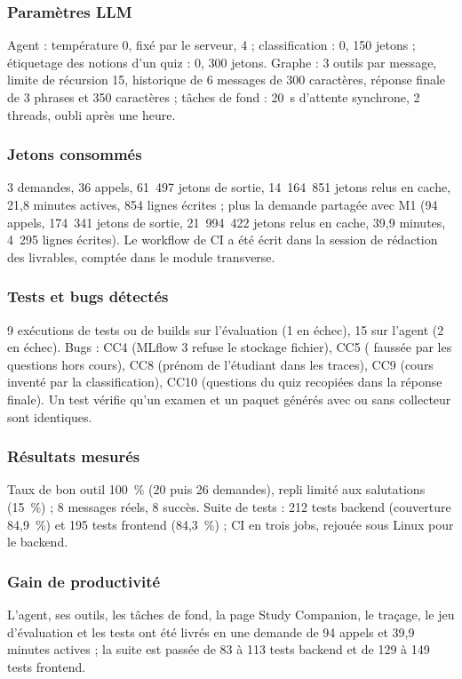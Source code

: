 \documentclass[12pt,a4paper]{report}
\DeclareRobustCommand{\code}[1]{\texttt{\codecasse{#1}}}
\begin{document}
\subsubsection{Paramètres LLM}
Agent : température 0, \code{max_tokens} fixé par le serveur, \code{max_retries} 4 ; classification :
0, 150 jetons ; étiquetage des notions d'un quiz : 0, 300 jetons. Graphe : 3 outils par message, limite de
récursion 15, historique de 6 messages de 300 caractères, réponse finale de 3 phrases et 350 caractères ;
tâches de fond : 20~s d'attente synchrone, 2 threads, oubli après une heure.

\subsubsection{Jetons consommés}
3 demandes, 36 appels, 61~497 jetons de sortie, 14~164~851 jetons relus en cache, 21,8 minutes actives,
854 lignes écrites ; plus la demande partagée avec M1 (94 appels, 174~341 jetons de sortie,
21~994~422 jetons relus en cache, 39,9 minutes, 4~295 lignes écrites). Le workflow de CI a été écrit dans
la session de rédaction des livrables, comptée dans le module transverse.

\subsubsection{Tests et bugs détectés}
9 exécutions de tests ou de builds sur l'évaluation (1 en échec), 15 sur l'agent (2 en échec). Bugs : CC4
(MLflow 3 refuse le stockage fichier), CC5 (\code{reponse_trouvee} faussée par les questions hors cours),
CC8 (prénom de l'étudiant dans les traces), CC9 (cours inventé par la classification), CC10 (questions
du quiz recopiées dans la réponse finale). Un test vérifie qu'un examen et un paquet générés avec ou sans
collecteur sont identiques.

\subsubsection{Résultats mesurés}
Taux de bon outil 100~\% (20 puis 26 demandes), repli limité aux salutations (15~\%) ; 8 messages réels,
8 succès. Suite de tests : 212 tests backend (couverture 84,9~\%) et 195 tests frontend (84,3~\%) ; CI en
trois jobs, rejouée sous Linux pour le backend.

\subsubsection{Gain de productivité}
L'agent, ses outils, les tâches de fond, la page Study Companion, le traçage, le jeu d'évaluation et les
tests ont été livrés en une demande de 94 appels et 39,9 minutes actives ; la suite est passée de 83 à
113 tests backend et de 129 à 149 tests frontend.
\end{document}
